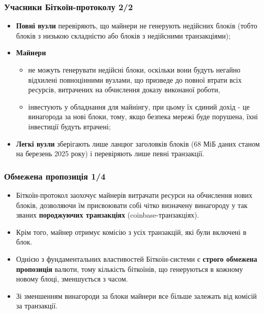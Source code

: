 \documentclass{beamer}
\begin{document}
\begin{frame}
  \frametitle{Учасники Біткоїн-протоколу 2/2}
  \begin{itemize}
  \item \textbf{Повні вузли} перевіряють, що майнери не генерують недійсних
    блоків (тобто блоків з низькою складністю або блоків з недійсними
    транзакціями);
  \item \textbf{Майнери}
    \begin{itemize}
    \item не можуть генерувати недійсні блоки, оскільки вони будуть негайно
      відхилені повноцінними вузлами, що призведе до повної втрати всіх
      ресурсів, витрачених на обчислення доказу виконаної роботи,
    \item інвестують у обладнання для майнінгу, при цьому їх єдиний дохід - це
      винагорода за нові блоки, тому, якщо безпека мережі буде порушена, їхні
      інвестиції будуть втрачені;
    \end{itemize}
  \item \textbf{Легкі вузли} зберігають лише ланцюг заголовків блоків (68 МіБ
    даних станом на березень 2025 року) і перевіряють лише певні транзакції.
  \end{itemize}
\end{frame}

\begin{frame}
  \frametitle{Обмежена пропозиція 1/4}
  \begin{itemize}
  \item Біткоїн-протокол заохочує майнерів витрачати ресурси на обчислення нових
    блоків, дозволяючи їм присвоювати собі чітко визначену винагороду у так
    званих \textbf{породжуючих транзакціях} (coinbase-транзакціях).
  \item Крім того, майнер отримує комісію з усіх транзакцій, які були включені в
    блок.
  \item Однією з фундаментальних властивостей Біткоїн-системи є \textbf{строго
      обмежена пропозиція} валюти, тому кількість біткоїнів, що генеруються в
    кожному новому блоці, зменшується з часом.
  \item Зі зменшенням винагороди за блоки майнери все більше залежать від
    комісій за транзакції.
  \end{itemize}
\end{frame}
\end{document}
